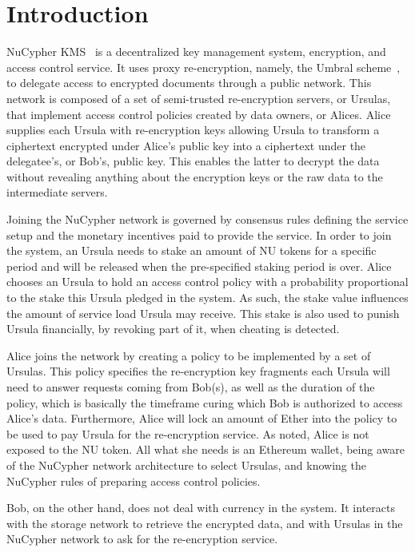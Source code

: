 \section{Introduction}
\label{intro}
NuCypher KMS~\cite{egorov2017nucypher} is a decentralized key management 
system, encryption, and access control service. It uses proxy re-encryption, namely, the 
Umbral  scheme~\cite{umbral2018}, to delegate access to encrypted 
documents through a public network. This network is composed of a set of semi-trusted 
re-encryption servers, or Ursulas, that implement access control policies created by data 
owners, or Alices. Alice supplies each Ursula with re-encryption keys allowing Ursula to transform 
a ciphertext encrypted under Alice's public key into a ciphertext under the delegatee's, or Bob's,  
public key. This enables the latter to decrypt the data without revealing anything about the 
encryption keys or the raw data to the intermediate servers.


Joining the NuCypher network is governed by consensus rules defining the service setup 
and the monetary incentives paid to provide the service. In order to join the 
system, an Ursula needs to stake an amount of NU tokens for a specific period 
and will be released when the pre-specified staking period is over. Alice chooses an  
Ursula to hold an access control policy with a probability proportional to the stake this Ursula 
pledged in the system. As such, the stake value influences the amount of service load Ursula 
may receive. This stake is also used to punish Ursula financially, by revoking part 
of it, when cheating is detected. 


Alice joins the network by creating a policy to be implemented by a 
set of Ursulas. This policy specifies the re-encryption key fragments each Ursula will
need to answer requests coming from Bob(s), as well as the duration of the policy, which 
is basically the timeframe curing which Bob is authorized to access Alice's data.  Furthermore, 
Alice will lock an amount of Ether into the policy to be used to pay Ursula for the re-encryption 
service. As noted, Alice is not exposed to the NU token. All what she needs is an Ethereum 
wallet, being aware of the NuCypher network architecture to select Ursulas, and knowing the 
NuCypher rules of preparing access control policies.


Bob, on the other hand, does not deal with currency in the system. It interacts with the storage 
network to retrieve the encrypted data, and with Ursulas in the NuCypher network to ask for the  
re-encryption service.



